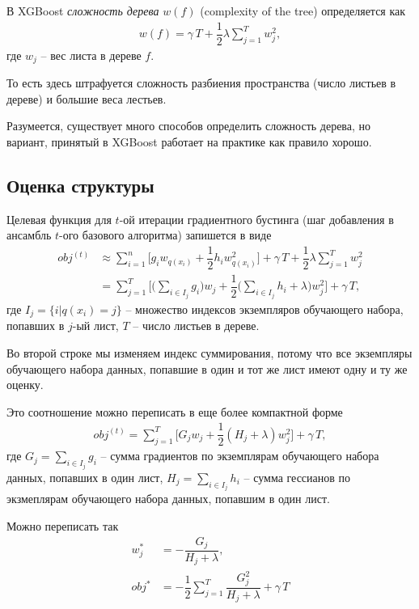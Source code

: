 \documentclass[%
	11pt,
	a4paper,
	utf8,
		]{article}
\begin{document}
В XGBoost \emph{сложность дерева} $ w(f) $ (complexity of the tree) определяется как
\begin{align*}
	w(f) = \gamma \, T + \dfrac{1}{2} \lambda \sum_{j=1}^{T} w_j^2,
\end{align*}
где $ w_j $ -- вес листа в дереве $ f $.

То есть здесь штрафуется сложность разбиения пространства (число листьев в дереве) и большие веса лестьев.

Разумеется, существует много способов определить сложность дерева, но вариант, принятый в XGBoost работает на практике как правило хорошо.

\subsection{Оценка структуры}

Целевая функция для $ t $-ой итерации градиентного бустинга (шаг добавления в ансамбль $ t $-ого базового алгоритма) запишется в виде
\begin{align*}
	obj^{(t)} &\approx \sum_{i=1}^n \Big[ g_i w_{ q(x_i) } + \dfrac{1}{2}h_i w_{ q(x_i) }^2 \Big] + \gamma \, T + \dfrac{1}{2} \lambda \sum_{j=1}^T w_j^2 \\
	 &= \sum_{j=1}^T \Big[ \Big( \sum_{ i \in I_j } g_i \Big) w_j + \dfrac{1}{2} \Big( \sum_{i \in I_j} h_i +\lambda \Big) w_j^2 \Big] + \gamma \, T,
\end{align*}
где $ I_j = \{ i | q(x_i) = j \} $ -- множество индексов экземпляров обучающего набора, попавших в $ j $-ый лист, $ T $ -- число листьев в дереве.

Во второй строке мы изменяем индекс суммирования, потому что все экземпляры обучающего набора данных, попавшие в один и тот же лист имеют одну и ту же оценку.

Это соотношение можно переписать в еще более компактной форме
\begin{align*}
	obj^{(t)} = \sum_{j=1}^T \Big[ G_j w_j + \dfrac{1}{2} (H_j + \lambda)w_j^2 \Big] + \gamma \, T,
\end{align*}
где $ G_j = \sum_{i \in I_j} g_i $ -- сумма градиентов по экземплярам обучающего набора данных, попавших в один лист, $ H_j = \sum_{ i \in I_j } h_i $ -- сумма гессианов по экзмеплярам обучающего набора данных, попавшим в один лист.

Можно переписать так
\begin{align*}
	w_j^* &= - \dfrac{ G_j }{ H_j + \lambda }, \\
	obj^* &= - \dfrac{1}{2} \sum_{j=1}^T \dfrac{ G_j^2 }{ H_j + \lambda } + \gamma \, T
\end{align*}
\end{document}

